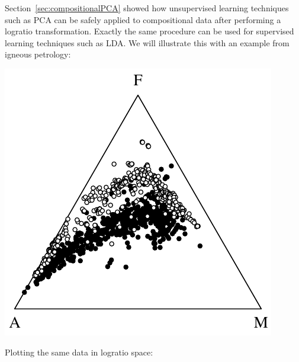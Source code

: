 Section~\ref{sec:compositionalPCA} showed how unsupervised learning
techniques such as PCA can be safely applied to compositional data
after performing a logratio transformation. Exactly the same procedure
can be used for supervised learning techniques such as LDA. We will
illustrate this with an example from igneous petrology:

\noindent\begin{minipage}[t][][b]{.35\textwidth}
\includegraphics[]{../figures/AFM.pdf}\medskip
\end{minipage}
\begin{minipage}[t][][t]{.65\textwidth}
  \label{fig:AFM}
\end{minipage}

Plotting the same data in logratio space:

